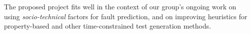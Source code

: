 \documentclass[10pt]{article}
\begin{document}
  The proposed project fits well in the context of our group's ongoing work on using \emph{socio-technical} factors for fault prediction, and on improving heuristics for property-based and other time-constrained test generation methods.




\footnotesize{
    
}
\end{document}
